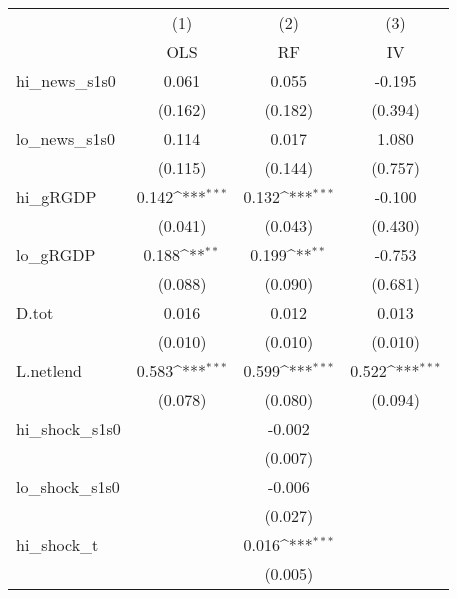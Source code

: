 {
\def\sym#1{\ifmmode^{#1}\else\(^{#1}\)\fi}
\begin{tabular}{l*{3}{c}}
\toprule
            &\multicolumn{1}{c}{(1)}&\multicolumn{1}{c}{(2)}&\multicolumn{1}{c}{(3)}\\
            &\multicolumn{1}{c}{OLS}&\multicolumn{1}{c}{RF}&\multicolumn{1}{c}{IV}\\
\midrule
hi\_news\_s1s0&       0.061         &       0.055         &      -0.195         \\
            &     (0.162)         &     (0.182)         &     (0.394)         \\
\addlinespace
lo\_news\_s1s0&       0.114         &       0.017         &       1.080         \\
            &     (0.115)         &     (0.144)         &     (0.757)         \\
\addlinespace
hi\_gRGDP    &       0.142\sym{***}&       0.132\sym{***}&      -0.100         \\
            &     (0.041)         &     (0.043)         &     (0.430)         \\
\addlinespace
lo\_gRGDP    &       0.188\sym{**} &       0.199\sym{**} &      -0.753         \\
            &     (0.088)         &     (0.090)         &     (0.681)         \\
\addlinespace
D.tot       &       0.016         &       0.012         &       0.013         \\
            &     (0.010)         &     (0.010)         &     (0.010)         \\
\addlinespace
L.netlend   &       0.583\sym{***}&       0.599\sym{***}&       0.522\sym{***}\\
            &     (0.078)         &     (0.080)         &     (0.094)         \\
\addlinespace
hi\_shock\_s1s0&                     &      -0.002         &                     \\
            &                     &     (0.007)         &                     \\
\addlinespace
lo\_shock\_s1s0&                     &      -0.006         &                     \\
            &                     &     (0.027)         &                     \\
\addlinespace
hi\_shock\_t  &                     &       0.016\sym{***}&                     \\
            &                     &     (0.005)         &                     \\

\end{tabular}}
